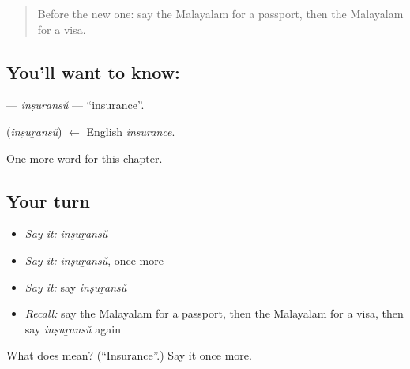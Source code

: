 \label{lesson:ML-C324-insuransu}



\begin{quote}
Before the new one: say the Malayalam for a passport, then the Malayalam for a visa.
\end{quote}

\subsection*{You'll want to know: }
\textbf{} — \emph{inṣuṟansŭ} — \textquotedblleft{}insurance\textquotedblright{}.

\begin{cousinweb}
\textbf{} (\emph{inṣuṟansŭ}) $\leftarrow$ English \emph{insurance}.
\end{cousinweb}

\begin{grammarlens}[title={What you've built}]
One more word for this chapter.
\end{grammarlens}

\subsection*{Your turn}
\begin{itemize}
\raggedright
  \item \emph{Say it:} \emph{inṣuṟansŭ}
  \item \emph{Say it:} \emph{inṣuṟansŭ}, once more
  \item \emph{Say it:} say \emph{inṣuṟansŭ}
  \item \emph{Recall:} say the Malayalam for a passport, then the Malayalam for a visa, then say \emph{inṣuṟansŭ} again
\end{itemize}

\begin{tcolorbox}[breakable,colback=teal!4,colframe=teal!35!black,title={Before you move on}]
What does  mean? (\textquotedblleft{}Insurance\textquotedblright{}.) Say it once more.
\end{tcolorbox}
